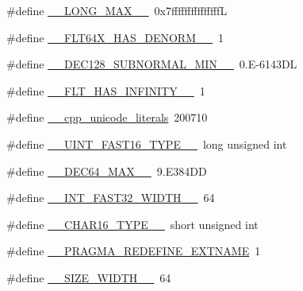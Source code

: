 \begin{DoxyCompactItemize}
\item 
\#define \hyperlink{cmake-build-debug_2babel__client__autogen_2moc__predefs_8h_af16678d7537c7a5463c807639fe2f635}{\+\_\+\+\_\+\+L\+O\+N\+G\+\_\+\+M\+A\+X\+\_\+\+\_\+}~0x7fffffffffffffffL
\item 
\#define \hyperlink{cmake-build-debug_2babel__client__autogen_2moc__predefs_8h_af8ad1ebe1976b0e31d68f9d223690126}{\+\_\+\+\_\+\+F\+L\+T64\+X\+\_\+\+H\+A\+S\+\_\+\+D\+E\+N\+O\+R\+M\+\_\+\+\_\+}~1
\item 
\#define \hyperlink{cmake-build-debug_2babel__client__autogen_2moc__predefs_8h_a63678ee519e34f99b61f3aeb5ff2cd75}{\+\_\+\+\_\+\+D\+E\+C128\+\_\+\+S\+U\+B\+N\+O\+R\+M\+A\+L\+\_\+\+M\+I\+N\+\_\+\+\_\+}~0.\+E-\/6143\+DL
\item 
\#define \hyperlink{cmake-build-debug_2babel__client__autogen_2moc__predefs_8h_a658d9ba84d429e748ce5f1905732c962}{\+\_\+\+\_\+\+F\+L\+T\+\_\+\+H\+A\+S\+\_\+\+I\+N\+F\+I\+N\+I\+T\+Y\+\_\+\+\_\+}~1
\item 
\#define \hyperlink{cmake-build-debug_2babel__client__autogen_2moc__predefs_8h_af550aeee74ffd7428490fe73f1023076}{\+\_\+\+\_\+cpp\+\_\+unicode\+\_\+literals}~200710
\item 
\#define \hyperlink{cmake-build-debug_2babel__client__autogen_2moc__predefs_8h_a5aed2c2843dad661012dac2d465f89e1}{\+\_\+\+\_\+\+U\+I\+N\+T\+\_\+\+F\+A\+S\+T16\+\_\+\+T\+Y\+P\+E\+\_\+\+\_\+}~long unsigned int
\item 
\#define \hyperlink{cmake-build-debug_2babel__client__autogen_2moc__predefs_8h_a06608084919123d90621d715daf1f456}{\+\_\+\+\_\+\+D\+E\+C64\+\_\+\+M\+A\+X\+\_\+\+\_\+}~9.\+E384\+DD
\item 
\#define \hyperlink{cmake-build-debug_2babel__client__autogen_2moc__predefs_8h_a7df1cb434b3b8baae4bf6053cb2a3a4a}{\+\_\+\+\_\+\+I\+N\+T\+\_\+\+F\+A\+S\+T32\+\_\+\+W\+I\+D\+T\+H\+\_\+\+\_\+}~64
\item 
\#define \hyperlink{cmake-build-debug_2babel__client__autogen_2moc__predefs_8h_a95b91b7560e936fdc4ce441d38b94b3e}{\+\_\+\+\_\+\+C\+H\+A\+R16\+\_\+\+T\+Y\+P\+E\+\_\+\+\_\+}~short unsigned int
\item 
\#define \hyperlink{cmake-build-debug_2babel__client__autogen_2moc__predefs_8h_a165bf2f00e518485a1bb58c1918205b0}{\+\_\+\+\_\+\+P\+R\+A\+G\+M\+A\+\_\+\+R\+E\+D\+E\+F\+I\+N\+E\+\_\+\+E\+X\+T\+N\+A\+ME}~1
\item 
\#define \hyperlink{cmake-build-debug_2babel__client__autogen_2moc__predefs_8h_a9eb6044e34be0d38146a2dadec14ecb2}{\+\_\+\+\_\+\+S\+I\+Z\+E\+\_\+\+W\+I\+D\+T\+H\+\_\+\+\_\+}~64

\end{DoxyCompactItemize}
